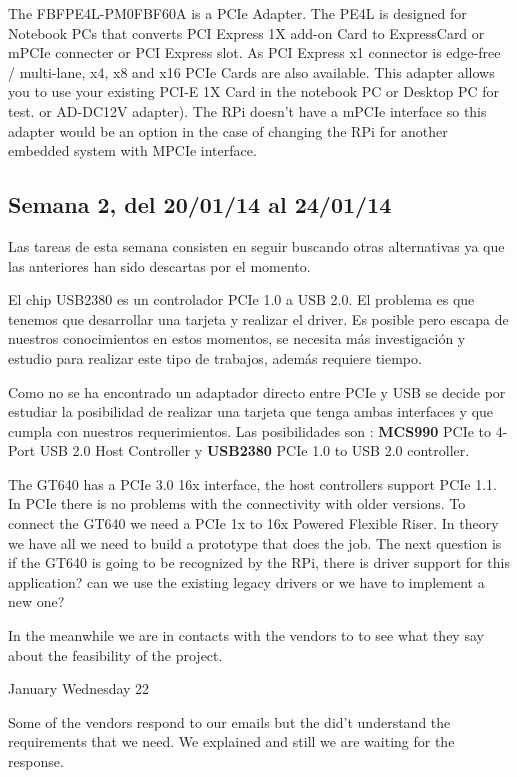 \documentclass[11pt,twoside]{report}
\begin{document}
The FBFPE4L-PM0FBF60A is a PCIe Adapter. The PE4L is designed for Notebook PCs that
converts PCI Express 1X add-on Card to ExpressCard or mPCIe connecter or PCI
Express slot. As PCI Express x1 connector is edge-free / multi-lane, x4, x8 and
x16 PCIe Cards are also available. This adapter allows you to use your existing
PCI-E 1X Card in the notebook PC or Desktop PC for test. or AD-DC12V adapter).
The RPi doesn't have a mPCIe interface so this adapter would be an option in
the case of changing the RPi for another embedded system with MPCIe interface.

\subsection*{Semana 2, del 20/01/14 al 24/01/14}

Las tareas de esta semana consisten en seguir buscando otras alternativas ya que las
anteriores han sido descartas por el momento.

El chip USB2380 es un controlador PCIe 1.0 a USB 2.0. El problema es que tenemos que
desarrollar una tarjeta y realizar el driver. Es posible pero escapa de nuestros
conocimientos en estos momentos, se necesita más investigación y estudio para realizar
este tipo de trabajos, además requiere tiempo. 

Como no se ha encontrado un adaptador directo entre PCIe y USB se decide por estudiar la
posibilidad de realizar una tarjeta que tenga ambas interfaces y que cumpla con nuestros
requerimientos. Las posibilidades son : \textbf{MCS990} PCIe to 4-Port USB 2.0 Host
Controller y \textbf{USB2380} PCIe 1.0 to USB 2.0 controller.


The GT640 has a PCIe 3.0 16x interface, the host controllers support PCIe 1.1. In PCIe there is no problems with the connectivity with older versions. To connect the GT640 we need a PCIe 1x to 16x Powered Flexible Riser. In theory we have all we need to build a prototype that does the job. The next question is if the GT640 is going to be recognized by the RPi, there is driver support for this application? can we use the existing legacy drivers or we have to implement a new one?

In the meanwhile we are in contacts with the vendors to to see what they say about the feasibility of the project.

January Wednesday 22

Some of the vendors respond to our emails but the did't understand the requirements that we need. We explained and still we are waiting for the response.
\end{document}
